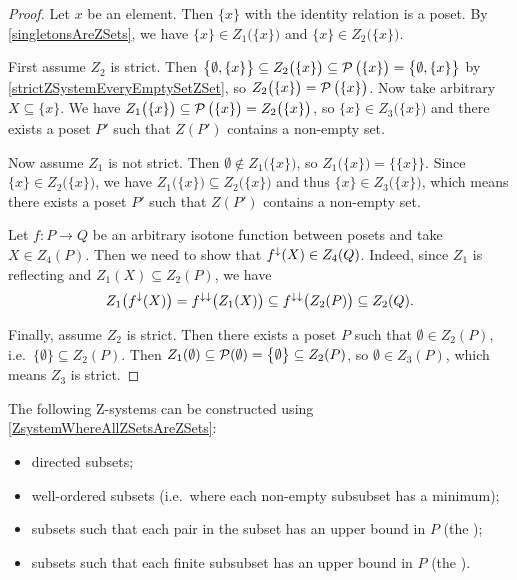 \begin{proof}
Let $x$ be an element. Then $\{x\}$ with the identity relation is a poset. By \ref{singletonsAreZSets}, we have $\{x\} \in Z_1\big(\{x\}\big)$ and $\{x\} \in Z_2\big(\{x\}\big)$.

First assume $Z_2$ is strict. Then $\big\{\emptyset, \{x\}\big\} \subseteq Z_2\big(\{x\}\big) \subseteq \operatorname{\mathcal{P}}\big(\{x\}\big) = \big\{\emptyset, \{x\}\big\}$ by \ref{strictZSystemEveryEmptySetZSet}, so $Z_2\big(\{x\}\big) = \operatorname{\mathcal{P}}\big(\{x\}\big)$. Now take arbitrary $X\subseteq \{x\}$. We have $Z_1\big(\{x\}\big) \subseteq \operatorname{\mathcal{P}}\big(\{x\}\big) = Z_2\big(\{x\}\big)$, so $\{x\} \in Z_3\big(\{x\}\big)$ and there exists a poset $P'$ such that $Z(P')$ contains a non-empty set.

Now assume $Z_1$ is not strict. Then $\emptyset \notin Z_1\big(\{x\}\big)$, so $Z_1\big(\{x\}\big) = \big\{\{x\}\big\}$. Since $\{x\} \in Z_2\big(\{x\}\big)$, we have $Z_1\big(\{x\}\big) \subseteq Z_2\big(\{x\})$ and thus $\{x\} \in Z_3\big(\{x\}\big)$, which means there exists a poset $P'$ such that $Z(P')$ contains a non-empty set.

Let $f: P\to Q$ be an arbitrary isotone function between posets and take $X\in Z_4(P)$. Then we need to show that $f^\downarrow(X) \in Z_4(Q)$. Indeed, since $Z_1$ is reflecting and $Z_1(X) \subseteq Z_2(P)$, we have
\[ Z_1\big(f^\downarrow(X)\big) = f^{\downarrow\downarrow}\big(Z_1(X)\big) \subseteq f^{\downarrow\downarrow}\big(Z_2(P)\big) \subseteq Z_2(Q). \]

Finally, assume $Z_2$ is strict. Then there exists a poset $P$ such that $\emptyset \in Z_2(P)$, i.e.\ $\big\{\emptyset\big\} \subseteq Z_2(P)$. Then $Z_1(\emptyset) \subseteq \operatorname{\mathcal{P}}(\emptyset) = \big\{\emptyset\big\} \subseteq Z_2(P)$, so $\emptyset\in Z_3(P)$, which means $Z_3$ is strict.
\end{proof}

\begin{example}
The following $\mathrm{Z}$-systems can be constructed using \ref{ZsystemWhereAllZSetsAreZSets}:
\begin{itemize}
\item directed subsets;
\item well-ordered subsets (i.e.\ where each non-empty subsubset has a minimum);
\item subsets such that each pair in the subset has an upper bound in $P$ (the );
\item subsets such that each finite subsubset has an upper bound in $P$ (the ).
\end{itemize}
\end{example}

